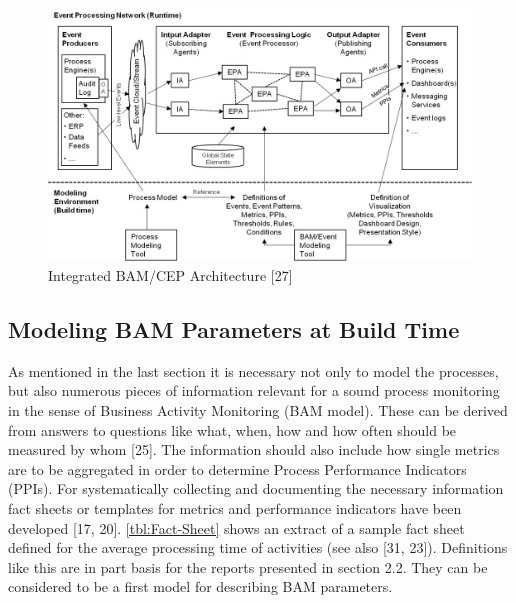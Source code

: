 \begin{figure}[h]
	\centering
	\includegraphics[width=0.9\linewidth]{Figures/Chapter5/Integrated-BAM-CEP-Architecture-27.jpg}
	\caption[Integrated BAM/CEP Architecture 27]{Integrated BAM/CEP Architecture [27]}
	\label{fig:BAMArchitecture}
\end{figure}



\subsection{Modeling BAM Parameters at Build Time}
As mentioned in the last section it is necessary not only to model the processes, but also numerous pieces of information relevant for a sound process monitoring in the sense of Business Activity Monitoring (BAM model). These can be derived from answers to questions like what, when, how and how often should be measured by whom [25]. The information should also include how single metrics are to be aggregated in order to determine Process Performance Indicators (PPIs). For systematically collecting and documenting the necessary information fact sheets or templates for metrics and performance indicators have been developed [17, 20]. \ref{tbl:Fact-Sheet} shows an extract of a sample fact sheet defined for the average processing time of activities (see also [31, 23]). Definitions like this are in part basis for the reports presented in section 2.2. They can be considered to be a first model for describing BAM parameters.


